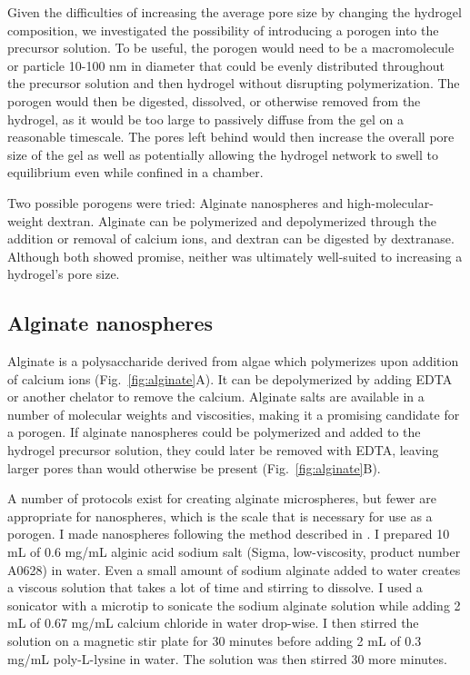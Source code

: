 Given the difficulties of increasing the average pore size by changing the hydrogel composition, we investigated the possibility of introducing a porogen into the precursor solution.  To be useful, the porogen would need to be a macromolecule or particle 10-100 nm in diameter that could be evenly distributed throughout the precursor solution and then hydrogel without disrupting polymerization.  The porogen would then be digested, dissolved, or otherwise removed from the hydrogel, as it would be too large to passively diffuse from the gel on a reasonable timescale.  The pores left behind would then increase the overall pore size of the gel as well as potentially allowing the hydrogel network to swell to equilibrium even while confined in a chamber.

Two possible porogens were tried: Alginate nanospheres and high-molecular-weight dextran.  Alginate can be polymerized and depolymerized through the addition or removal of calcium ions, and dextran can be digested by dextranase.  Although both showed promise, neither was ultimately well-suited to increasing a hydrogel's pore size.

\subsection{Alginate nanospheres}

Alginate is a polysaccharide derived from algae which polymerizes upon addition of calcium ions (Fig.~\ref{fig:alginate}A).  It can be depolymerized by adding EDTA or another chelator to remove the calcium.  Alginate salts are available in a number of molecular weights and viscosities, making it a promising candidate for a porogen.  If alginate nanospheres could be polymerized and added to the hydrogel precursor solution, they could later be removed with EDTA, leaving larger pores than would otherwise be present (Fig.~\ref{fig:alginate}B).

A number of protocols exist for creating alginate microspheres, but fewer are appropriate for nanospheres, which is the scale that is necessary for use as a porogen.  I made nanospheres following the method described in \cite{de03}.  I prepared 10 mL of 0.6 mg/mL alginic acid sodium salt (Sigma, low-viscosity, product number A0628) in water.  Even a small amount of sodium alginate added to water creates a viscous solution that takes a lot of time and stirring to dissolve.  I used a sonicator with a microtip to sonicate the sodium alginate solution while adding 2 mL of 0.67 mg/mL calcium chloride in water drop-wise.  I then stirred the solution on a magnetic stir plate for 30 minutes before adding 2 mL of 0.3 mg/mL poly-L-lysine in water.  The solution was then stirred 30 more minutes.

